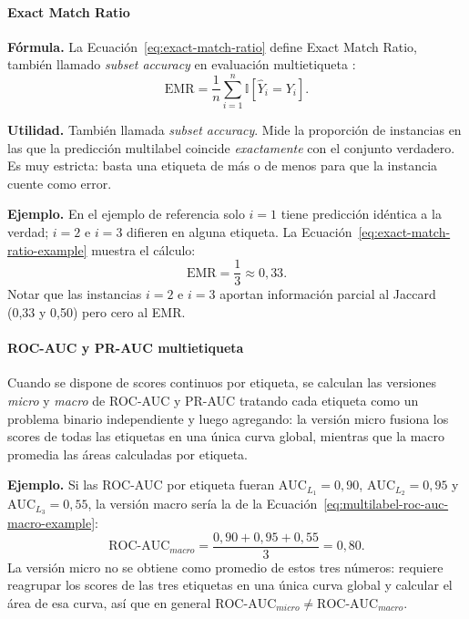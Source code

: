 \documentclass[12pt,oneside]{report}
\newcommand{\ind}{\mathbb{I}} %
\begin{document}
\paragraph{Exact Match Ratio}

\textbf{Fórmula.} La Ecuación~\eqref{eq:exact-match-ratio} define Exact Match Ratio, también llamado \emph{subset accuracy} en evaluación multietiqueta \cite{tsoumakas_multilabel_overview,read2011}:
\begin{equation}
\label{eq:exact-match-ratio}
\mathrm{EMR}=\frac{1}{n}\sum_{i=1}^n \ind[\hat{Y}_i = Y_i].
\end{equation}

\textbf{Utilidad.} También llamada \emph{subset accuracy}. Mide la
proporción de instancias en las que la predicción multilabel coincide
\emph{exactamente} con el conjunto verdadero. Es muy estricta: basta una
etiqueta de más o de menos para que la instancia cuente como error.

\textbf{Ejemplo.} En el ejemplo de referencia solo $i=1$ tiene
predicción idéntica a la verdad; $i=2$ e $i=3$ difieren en alguna
etiqueta. La Ecuación~\eqref{eq:exact-match-ratio-example} muestra el cálculo:
\begin{equation}
\label{eq:exact-match-ratio-example}
\mathrm{EMR}=\frac{1}{3}\approx 0{,}33.
\end{equation}
Notar que las instancias $i=2$ e $i=3$ aportan información parcial al
Jaccard (0{,}33 y 0{,}50) pero cero al EMR.

\paragraph{ROC-AUC y PR-AUC multietiqueta}

Cuando se dispone de scores continuos por etiqueta, se calculan las
versiones \emph{micro} y \emph{macro} de ROC-AUC y PR-AUC tratando cada
etiqueta como un problema binario independiente y luego agregando: la
versión micro fusiona los scores de todas las etiquetas en una única
curva global, mientras que la macro promedia las áreas calculadas por
etiqueta.

\textbf{Ejemplo.} Si las ROC-AUC por etiqueta fueran $\mathrm{AUC}_{L_1}=0{,}90$,
$\mathrm{AUC}_{L_2}=0{,}95$ y $\mathrm{AUC}_{L_3}=0{,}55$, la versión
macro sería la de la Ecuación~\eqref{eq:multilabel-roc-auc-macro-example}:
\begin{equation}
\label{eq:multilabel-roc-auc-macro-example}
\mathrm{ROC\text{-}AUC}_{macro}=\frac{0{,}90+0{,}95+0{,}55}{3}=0{,}80.
\end{equation}
La versión micro no se obtiene como promedio de estos tres números:
requiere reagrupar los scores de las tres etiquetas en una única curva
global y calcular el área de esa curva, así que en general
$\mathrm{ROC\text{-}AUC}_{micro}\ne \mathrm{ROC\text{-}AUC}_{macro}$.
\end{document}
